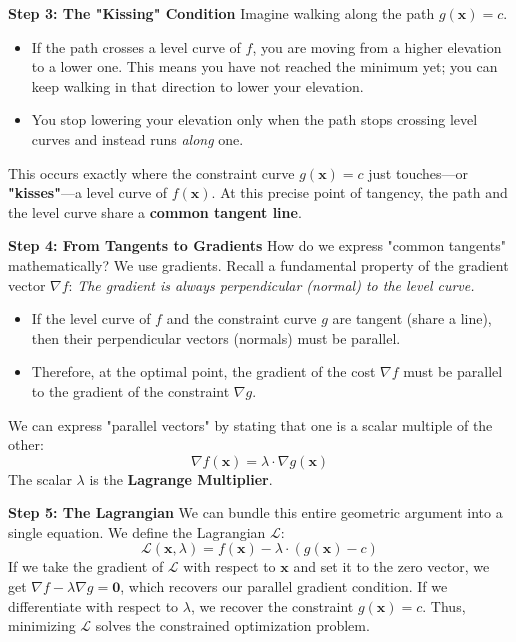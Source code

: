 \documentclass{book}
\begin{document}
\textbf{Step 3: The "Kissing" Condition}
Imagine walking along the path $g(\mathbf{x})=c$.
\begin{itemize}
    \item If the path crosses a level curve of $f$, you are moving from a higher elevation to a lower one. This means you have not reached the minimum yet; you can keep walking in that direction to lower your elevation.
    \item You stop lowering your elevation only when the path stops crossing level curves and instead runs \textit{along} one.
\end{itemize}
This occurs exactly where the constraint curve $g(\mathbf{x})=c$ just touches—or \textbf{"kisses"}—a level curve of $f(\mathbf{x})$. At this precise point of tangency, the path and the level curve share a \textbf{common tangent line}.

\textbf{Step 4: From Tangents to Gradients}
How do we express "common tangents" mathematically? We use gradients.
Recall a fundamental property of the gradient vector $\nabla f$: \textit{The gradient is always perpendicular (normal) to the level curve.}
\begin{itemize}
    \item If the level curve of $f$ and the constraint curve $g$ are tangent (share a line), then their perpendicular vectors (normals) must be parallel.
    \item Therefore, at the optimal point, the gradient of the cost $\nabla f$ must be parallel to the gradient of the constraint $\nabla g$.
\end{itemize}

We can express "parallel vectors" by stating that one is a scalar multiple of the other:
\begin{equation}
\nabla f(\mathbf{x}) = \lambda \cdot \nabla g(\mathbf{x})
\end{equation}
The scalar $\lambda$ is the \textbf{Lagrange Multiplier}. 

\textbf{Step 5: The Lagrangian}
We can bundle this entire geometric argument into a single equation. We define the Lagrangian $\mathcal{L}$:
\begin{equation}
\mathcal{L}(\mathbf{x}, \lambda) = f(\mathbf{x}) - \lambda \cdot (g(\mathbf{x}) - c)
\end{equation}
If we take the gradient of $\mathcal{L}$ with respect to $\mathbf{x}$ and set it to the zero vector, we get $\nabla f - \lambda \nabla g = \mathbf{0}$, which recovers our parallel gradient condition. If we differentiate with respect to $\lambda$, we recover the constraint $g(\mathbf{x}) = c$. Thus, minimizing $\mathcal{L}$ solves the constrained optimization problem.
\end{document}
